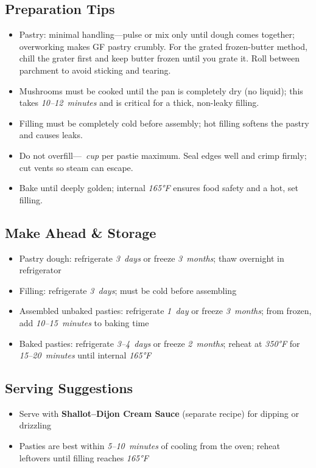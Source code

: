 \documentclass[11pt,letterpaper]{article}
\begin{document}
\subsection*{Preparation Tips}
\begin{itemize}
    \item Pastry: minimal handling---pulse or mix only until dough comes together; overworking makes GF pastry crumbly. For the grated frozen-butter method, chill the grater first and keep butter frozen until you grate it. Roll between parchment to avoid sticking and tearing.
    \item Mushrooms must be cooked until the pan is completely dry (no liquid); this takes \textit{10--12~minutes} and is critical for a thick, non-leaky filling.
    \item Filling must be completely cold before assembly; hot filling softens the pastry and causes leaks.
    \item Do not overfill---\textit{~cup} per pastie maximum. Seal edges well and crimp firmly; cut vents so steam can escape.
    \item Bake until deeply golden; internal \textit{165°F} ensures food safety and a hot, set filling.
\end{itemize}

\subsection*{Make Ahead \& Storage}
\begin{itemize}
    \item Pastry dough: refrigerate \textit{3~days} or freeze \textit{3~months}; thaw overnight in refrigerator
    \item Filling: refrigerate \textit{3~days}; must be cold before assembling
    \item Assembled unbaked pasties: refrigerate \textit{1~day} or freeze \textit{3~months}; from frozen, add \textit{10--15~minutes} to baking time
    \item Baked pasties: refrigerate \textit{3--4~days} or freeze \textit{2~months}; reheat at \textit{350°F} for \textit{15--20~minutes} until internal \textit{165°F}
\end{itemize}

\subsection*{Serving Suggestions}
\begin{itemize}
    \item Serve with \textbf{Shallot--Dijon Cream Sauce} (separate recipe) for dipping or drizzling
    \item Pasties are best within \textit{5--10~minutes} of cooling from the oven; reheat leftovers until filling reaches \textit{165°F}
\end{itemize}
\end{document}
